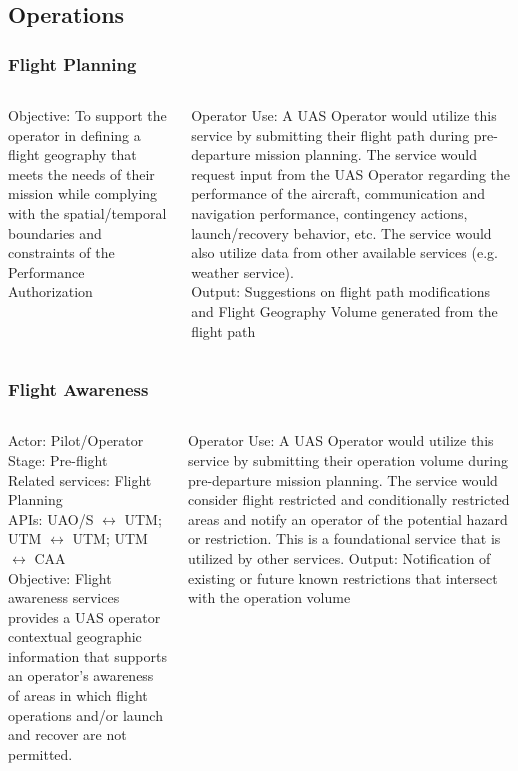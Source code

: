 \documentclass[usenames,dvipsnames,aspectratio=169,serif]{beamer}
\begin{document}
\subsection{Operations}
\begin{frame}
   \frametitle{Flight Planning}
   \begin{columns}[t]
      \begin{column}{0.5\textwidth}
         {Objective: To support the operator in defining a flight geography that meets the needs of their mission while complying with the spatial/temporal boundaries and constraints of the Performance Authorization}
      \end{column}
      \begin{column}{0.5\textwidth}
         Operator Use: A UAS Operator would utilize this service by submitting their flight path during pre-departure mission planning. The service would request input from the UAS Operator regarding the performance of the aircraft, communication and navigation performance, contingency actions, launch/recovery behavior, etc. The service would also utilize data from other available services (e.g. weather service). \\
         Output: Suggestions on flight path modifications and Flight Geography Volume generated from the flight path
      \end{column}
   \end{columns}
\end{frame}


\begin{frame}
   \frametitle{Flight Awareness}
   \begin{columns}[t]
      \begin{column}{0.5\textwidth}
         Actor: Pilot/Operator \\
         Stage: Pre-flight \\
         Related services: Flight Planning \\
         APIs: UAO/S $\leftrightarrow$ UTM; UTM $\leftrightarrow$ UTM; UTM $\leftrightarrow$ CAA \\
         Objective: Flight awareness services provides a UAS operator contextual geographic information that supports an operator's awareness of areas in which flight operations and/or launch and recover are not permitted.
      \end{column}
      \begin{column}{0.5\textwidth}
         Operator Use: A UAS Operator would utilize this service by submitting their operation volume during pre-departure mission planning. The service would consider flight restricted and conditionally restricted areas and notify an operator of the potential hazard or restriction. This is a foundational service that is utilized by other services.
         Output: Notification of existing or future known restrictions that intersect with the operation volume
      \end{column}
   \end{columns}
\end{frame}
\end{document}

